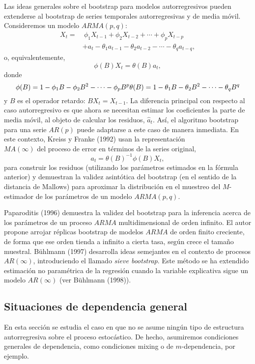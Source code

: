 \documentclass[]{book}
\theoremstyle{break}
\theoremstyle{definition}
\theoremstyle{definition}
\theoremstyle{definition}
\theoremstyle{remark}
\begin{document}
Las ideas generales sobre el bootstrap para modelos autorregresivos
pueden extenderse al bootstrap de series temporales autorregresivas y de
media móvil. Consideremos un modelo \(ARMA(p,q)\): \[\begin{aligned}
X_{t} =&\ \phi _1X_{t-1}+\phi _2X_{t-2}+\cdots +\phi _{p}X_{t-p} \\
&+a_{t}-\theta _1a_{t-1}-\theta _2a_{t-2}-\cdots -\theta _{q}a_{t-q},\end{aligned}\]o,
equivalentemente, \[\phi (B)X_{t}=\theta (B)a_{t},\] donde
\[\phi (B)=1-\phi _1B-\phi _2B^2-\cdots -\phi _{p}B^{p}\\ 
\theta(B)=1-\theta _1B-\theta _2B^2-\cdots -\theta _{q}B^{q}\] y \(B\)
es el operador retardo: \(BX_{t}=X_{t-1}\). La diferencia principal con
respecto al caso autorregresivo es que ahora se necesitan estimar los
coeficientes la parte de media móvil, al objeto de calcular los
residuos, \(\widehat{a}_{t}\). Así, el algoritmo bootstrap para una
serie \(AR(p)\) puede adaptarse a este caso de manera inmediata. En este
contexto, Kreiss y Franke (1992) usan la representación\\
\(MA(\infty )\) del proceso de error en términos de la series original,
\[a_{t}=\theta (B)^{-1}\phi(B) X_{t},\] para construir los residuos
(utilizando los parámetros estimados en la fórmula anterior) y
demuestran la validez asintótica del bootstrap (en el sentido de la
distancia de Mallows) para aproximar la distribución en el muestreo del
\(M\)-estimador de los parámetros de un modelo \(ARMA(p,q)\).

Paparoditis (1996) demuestra la validez del bootstrap para la inferencia
acerca de los parámetros de un proceso \(ARMA\) multidimensional de
orden infinito. El autor propone arrojar réplicas bootstrap de modelos
\(ARMA\) de orden finito creciente, de forma que ese orden tienda a
infinito a cierta tasa, según crece el tamaño muestral. Bühlmann (1997)
desarrolla ideas semejantes en el contexto de procesos
\(AR\left( \infty \right)\), introduciendo el llamado \emph{sieve
bootstrap}. Este método se ha extendido estimación no paramétrica de la
regresión cuando la variable explicativa sigue un modelo
\(AR\left( \infty \right)\) (ver Bühlmann (1998)).

\subsection{Situaciones de dependencia
general}\label{situaciones-de-dependencia-general-1}

En esta sección se estudia el caso en que no se asume ningún tipo de
estructura autorregresiva sobre el proceso estocástico. De hecho,
asumiremos condiciones generales de dependencia, como condiciones mixing
o de \(m\)-dependencia, por ejemplo.
\end{document}
